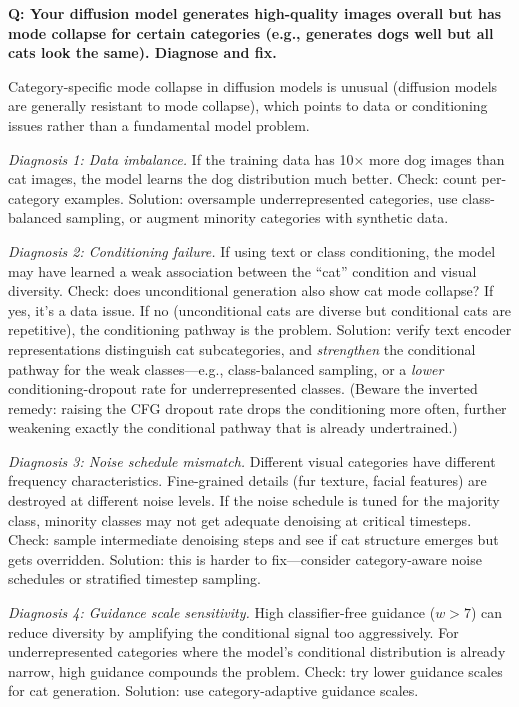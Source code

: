 \begin{interviewq}
\textbf{Q: Your diffusion model generates high-quality images overall but has mode collapse for certain categories (e.g., generates dogs well but all cats look the same). Diagnose and fix.}

 \quad {} \quad \badgefreq{\freqmed}

\stronganswer Category-specific mode collapse in diffusion models is unusual (diffusion models are generally resistant to mode collapse), which points to data or conditioning issues rather than a fundamental model problem.

\textit{Diagnosis 1: Data imbalance.} If the training data has 10$\times$ more dog images than cat images, the model learns the dog distribution much better. Check: count per-category examples. Solution: oversample underrepresented categories, use class-balanced sampling, or augment minority categories with synthetic data.

\textit{Diagnosis 2: Conditioning failure.} If using text or class conditioning, the model may have learned a weak association between the ``cat'' condition and visual diversity. Check: does unconditional generation also show cat mode collapse? If yes, it's a data issue. If no (unconditional cats are diverse but conditional cats are repetitive), the conditioning pathway is the problem. Solution: verify text encoder representations distinguish cat subcategories, and \textit{strengthen} the conditional pathway for the weak classes---e.g., class-balanced sampling, or a \textit{lower} conditioning-dropout rate for underrepresented classes. (Beware the inverted remedy: raising the CFG dropout rate drops the conditioning more often, further weakening exactly the conditional pathway that is already undertrained.)

\textit{Diagnosis 3: Noise schedule mismatch.} Different visual categories have different frequency characteristics. Fine-grained details (fur texture, facial features) are destroyed at different noise levels. If the noise schedule is tuned for the majority class, minority classes may not get adequate denoising at critical timesteps. Check: sample intermediate denoising steps and see if cat structure emerges but gets overridden. Solution: this is harder to fix---consider category-aware noise schedules or stratified timestep sampling.

\textit{Diagnosis 4: Guidance scale sensitivity.} High classifier-free guidance ($w > 7$) can reduce diversity by amplifying the conditional signal too aggressively. For underrepresented categories where the model's conditional distribution is already narrow, high guidance compounds the problem. Check: try lower guidance scales for cat generation. Solution: use category-adaptive guidance scales.


\end{interviewq}
